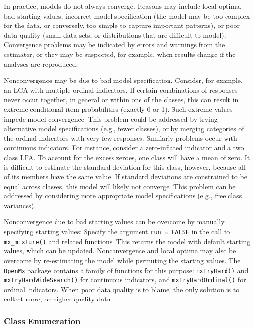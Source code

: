 \documentclass[
  ,man,floatsintext]{apa6}
\begin{document}
In practice, models do not always converge.
Reasons may include local optima,
bad starting values,
incorrect model specification (the model may be too complex for the data, or conversely, too simple to capture important patterns),
or poor data quality (small data sets, or distributions that are difficult to model).
Convergence problems may be indicated by errors and warnings from the estimator,
or they may be suspected, for example,
when results change if the analyses are reproduced.

Nonconvergence may be due to bad model specification.
Consider, for example, an LCA with multiple ordinal indicators.
If certain combinations of responses never occur together,
in general or within one of the classes,
this can result in extreme conditional item probabilities (exactly 0 or 1).
Such extreme values impede model convergence.
This problem could be addressed by trying alternative model specifications (e.g., fewer classes),
or by merging categories of the ordinal indicators with very few responses.
Similarly problems occur with continuous indicators.
For instance, consider a zero-inflated indicator and a two class LPA.
To account for the excess zeroes, one class will have a mean of zero.
It is difficult to estimate the standard deviation for this class, however, because all of its members have the same value.
If standard deviations are constrained to be equal across classes,
this model will likely not converge.
This problem can be addressed by considering more appropriate model specifications (e.g., free class variances).

Nonconvergence due to bad starting values
can be overcome by manually specifying starting values:
Specify the argument \texttt{run\ =\ FALSE} in the call to \texttt{mx\_mixture()} and related functions.
This returns the model with default starting values, which can be updated.
Nonconvergence and local optima may also be overcome by re-estimating the model while permuting the starting values.
The \texttt{OpenMx} package contains a family of functions for this purpose: \texttt{mxTryHard()} and \texttt{mxTryHardWideSearch()} for continuous indicators, and \texttt{mxTryHardOrdinal()} for ordinal indicators.
When poor data quality is to blame, the only solution is to collect more, or higher quality data.

\hypertarget{class-enumeration}{%
\subsubsection{Class Enumeration}\label{class-enumeration}}
\end{document}
